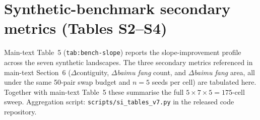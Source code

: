 \documentclass[11pt]{article}
\begin{document}
\begin{table}[htbp]
\centering
\small
\caption{MPC optimisation ablation across four dimensions, on the MSE-only world-model ensemble (Bishan District). All variants start from the optimal $H{=}5$, $K{=}50$ random-reward configuration and modify one dimension. None exceeds the random-sampling baseline; aggressive exploitation (greedy continuation) actively reverses the slope direction. The diagnostic shows that the failure is structural to the learned model rather than to the search procedure.}
\label{tab:si-mpc-ablation}
\end{table}

\section{Synthetic-benchmark secondary metrics (Tables S2--S4)}\label{si:s3-bench-secondary}

Main-text Table~5 (\texttt{tab:bench-slope}) reports the slope-improvement profile across the seven synthetic landscapes. The three secondary metrics referenced in main-text Section~6 ($\Delta$contiguity, $\Delta$\textit{baimu fang} count, and $\Delta$\textit{baimu fang} area, all under the same 50-pair swap budget and $n{=}5$ seeds per cell) are tabulated here. Together with main-text Table~5 these summarise the full $5 \times 7 \times 5 = 175$-cell sweep. Aggregation script: \texttt{scripts/si\_tables\_v7.py} in the released code repository.
\end{document}
